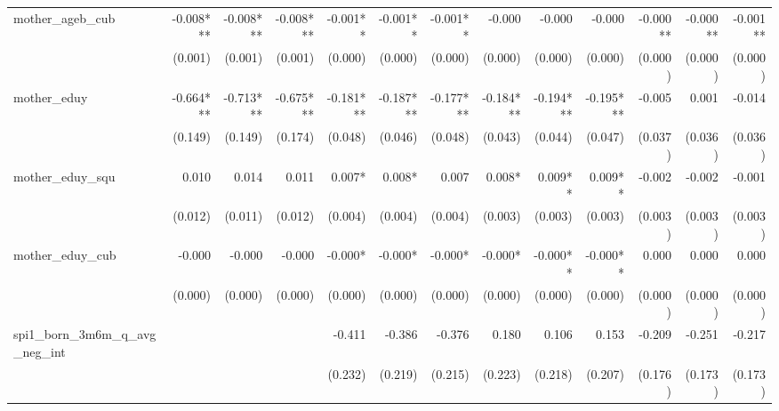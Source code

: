 \begin{tabular}{lrrrrrrrrrrrr}
mother\_ageb\_cub                           &    -0.008*** &    -0.008*** &    -0.008*** &     -0.001** &     -0.001** &     -0.001** &       -0.000 &       -0.000 &       -0.000 &     -0.000** &     -0.000** &     -0.001** \\ 
                                            &      (0.001) &      (0.001) &      (0.001) &      (0.000) &      (0.000) &      (0.000) &      (0.000) &      (0.000) &      (0.000) &      (0.000) &      (0.000) &      (0.000) \\ 
mother\_eduy                                &    -0.664*** &    -0.713*** &    -0.675*** &    -0.181*** &    -0.187*** &    -0.177*** &    -0.184*** &    -0.194*** &    -0.195*** &       -0.005 &        0.001 &       -0.014 \\ 
                                            &      (0.149) &      (0.149) &      (0.174) &      (0.048) &      (0.046) &      (0.048) &      (0.043) &      (0.044) &      (0.047) &      (0.037) &      (0.036) &      (0.036) \\ 
mother\_eduy\_squ                           &        0.010 &        0.014 &        0.011 &       0.007* &       0.008* &        0.007 &       0.008* &      0.009** &      0.009** &       -0.002 &       -0.002 &       -0.001 \\ 
                                            &      (0.012) &      (0.011) &      (0.012) &      (0.004) &      (0.004) &      (0.004) &      (0.003) &      (0.003) &      (0.003) &      (0.003) &      (0.003) &      (0.003) \\ 
mother\_eduy\_cub                           &       -0.000 &       -0.000 &       -0.000 &      -0.000* &      -0.000* &      -0.000* &      -0.000* &     -0.000** &     -0.000** &        0.000 &        0.000 &        0.000 \\ 
                                            &      (0.000) &      (0.000) &      (0.000) &      (0.000) &      (0.000) &      (0.000) &      (0.000) &      (0.000) &      (0.000) &      (0.000) &      (0.000) &      (0.000) \\ 
spi1\_born\_3m6m\_q\_avg\_neg\_int          &              &              &              &       -0.411 &       -0.386 &       -0.376 &        0.180 &        0.106 &        0.153 &       -0.209 &       -0.251 &       -0.217 \\ 
                                            &              &              &              &      (0.232) &      (0.219) &      (0.215) &      (0.223) &      (0.218) &      (0.207) &      (0.176) &      (0.173) &      (0.173) \\ 

\end{tabular}
